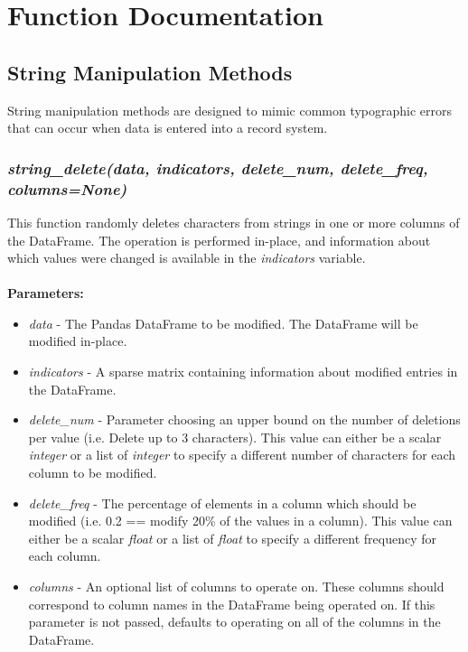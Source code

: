 \documentclass[titlepage, 11pt]{article}
\begin{document}
\section{Function Documentation}



\newcommand{\parmdesc}[2]{\textit{#1} - #2}

\newcommand{\docdata}{\parmdesc{data}{The Pandas DataFrame to be modified. The DataFrame will be modified in-place.}}

\newcommand{\docindc}{\parmdesc{indicators}{A sparse matrix containing information about modified entries in the DataFrame.}}

\newcommand{\doccols}{\parmdesc{columns}{An optional list of columns to operate on. These columns should correspond to column names in the DataFrame being operated on. If this parameter is not passed, defaults to operating on all of the columns in the DataFrame.}}


\subsection{String Manipulation Methods}\label{stringmanip}
String manipulation methods are designed to mimic common typographic errors that can occur when data is entered into a record system.

\subsubsection{\textit{string\_delete(data, indicators, delete\_num, delete\_freq, columns=None)}}

This function randomly deletes characters from strings in one or more columns of the DataFrame. The operation is performed in-place, and information about which values were changed is available in the \textit{indicators} variable.
\\
\\
\textbf{Parameters:}
\begin{itemize}
    \item \docdata
    \item \docindc
    \item \parmdesc{delete\_num}{Parameter choosing an upper bound on the number of deletions per value (i.e. Delete up to 3 characters). This value can either be a scalar \textit{integer} or a list of \textit{integer} to specify a different number of characters for each column to be modified.}
    \item  \parmdesc{delete\_freq}{The percentage of elements in a column which should be modified (i.e. 0.2 == modify 20\% of the values in a column). This value can either be a scalar \textit{float} or a list of \textit{float} to specify a different frequency for each column.}
    \item \doccols
\end{itemize}
\end{document}
